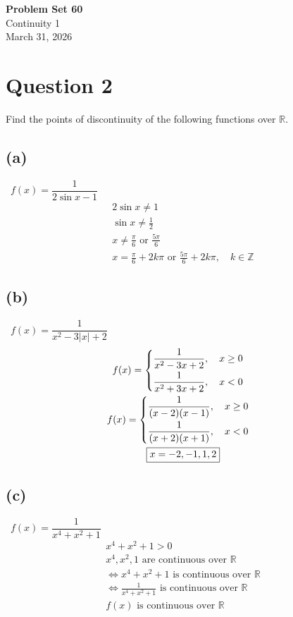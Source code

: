 \documentclass[12pt]{article}
\begin{document}
\vspace*{0cm}

\begin{center}
    {\Large \bfseries Problem Set 60} \\[0.5cm]
    {\large Continuity 1} \\[0.35cm]
    {\normalsize March 31, 2026}
\end{center}


\section{Question 2}
Find the points of discontinuity of the following functions over $\mathbb{R}$. \vspace{0.3em}

\subsection{(a)} \, $f(x)=\dfrac{1}{2 \sin x-1}$
\begin{gather*}
    2\sin x \ne 1\\
    \sin x \ne \frac{1}{2}\\
    x \ne \frac{\pi}{6} \text{ or } \frac{5\pi}{6}\\
    \boxed{x=\frac{\pi}{6}+2k\pi \text{ or } \frac{5\pi}{6}+2k\pi,\quad k\in \mathbb{Z}}
\end{gather*}

\subsection{(b)} \, $f(x)=\dfrac{1}{x^2-3|x|+2}$
\begin{gather*}
    f(x)=\begin{cases}
        \dfrac{1}{x^2-3x+2},\quad x\ge 0 \vspace{0.3em}\\
        \dfrac{1}{x^2+3x+2}, \quad x<0
    \end{cases}\\ 
    f(x)=\begin{cases}
        \dfrac{1}{(x-2)(x-1)},\quad x\ge 0 \vspace{0.3em}\\
        \dfrac{1}{(x+2)(x+1)}, \quad x<0
    \end{cases}\\
    \boxed{x=-2,-1,1,2}
\end{gather*}

\subsection{(c)} \, $f(x)=\dfrac{1}{x^4+x^2+1}$
\begin{gather*}
    x^4+x^2+1>0\\
    x^4, x^2, 1 \text{ are continuous over } \mathbb{R}\\
    \iff x^4+x^2+1 \text{ is continuous over } 
    \mathbb{R}\\
    \iff \frac{1}{x^4+x^2+1} \text{ is continuous over } \mathbb{R}\\
    \boxed{f(x)\text{ is continuous over } \mathbb{R}}
\end{gather*}
\end{document}
